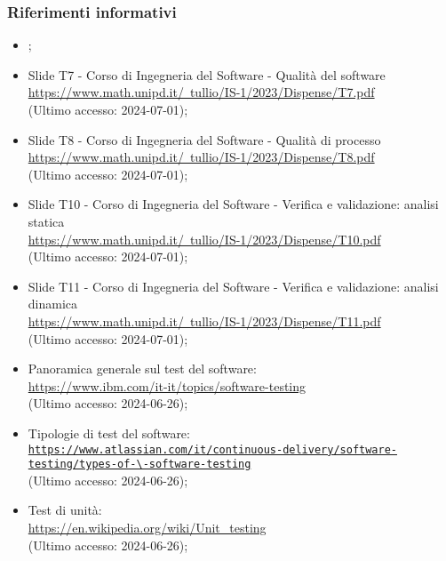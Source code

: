 \subsubsection{Riferimenti informativi}
\begin{itemize}
  \item \AnalisiDeiRequisiti;
  \item Slide T7 - Corso di Ingegneria del Software - Qualità del software \\ \href{https://www.math.unipd.it/~tullio/IS-1/2023/Dispense/T7.pdf}{https://www.math.unipd.it/~tullio/IS-1/2023/Dispense/T7.pdf}  \\ (Ultimo accesso: 2024-07-01);
  \item Slide T8 - Corso di Ingegneria del Software - Qualità di processo \\ \href{https://www.math.unipd.it/~tullio/IS-1/2023/Dispense/T8.pdf}{https://www.math.unipd.it/~tullio/IS-1/2023/Dispense/T8.pdf}  \\ (Ultimo accesso: 2024-07-01);
  \item Slide T10 - Corso di Ingegneria del Software - Verifica e validazione: analisi statica \\ \href{https://www.math.unipd.it/~tullio/IS-1/2023/Dispense/T10.pdf}{https://www.math.unipd.it/~tullio/IS-1/2023/Dispense/T10.pdf}  \\ (Ultimo accesso: 2024-07-01);
  \item Slide T11 - Corso di Ingegneria del Software - Verifica e validazione: analisi dinamica \\ \href{https://www.math.unipd.it/~tullio/IS-1/2023/Dispense/T11.pdf}{https://www.math.unipd.it/~tullio/IS-1/2023/Dispense/T11.pdf}  \\ (Ultimo accesso: 2024-07-01);
  \item Panoramica generale sul test del software: \\ \href{https://www.ibm.com/it-it/topics/software-testing}{https://www.ibm.com/it-it/topics/software-testing}  \\ (Ultimo accesso: 2024-06-26);
  \item Tipologie di test del software: \\ \href{https://www.atlassian.com/it/continuous-delivery/software-testing/types-of-software-testing}{\nolinkurl{https://www.atlassian.com/it/continuous-delivery/software-testing/types-of-\-software-testing}}  \\ (Ultimo accesso: 2024-06-26);
  \item Test di unità: \\ \href{https://en.wikipedia.org/wiki/Unit_testing}{https://en.wikipedia.org/wiki/Unit\_testing}  \\ (Ultimo accesso: 2024-06-26);

\end{itemize}
